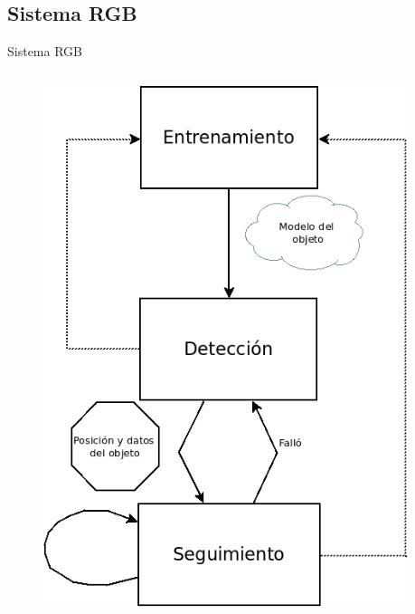\documentclass[]{beamer}
\begin{document}
\subsection{Sistema RGB}
\begin{frame}[fragile]{Sistema RGB}
    \begin{columns}
        \begin{column}{0.4\textwidth}
            \begin{figure}
                \centering
                \vspace{-25pt}
                \includegraphics[scale=0.3]{img/esquema_seguimiento.png}
            \end{figure}
        \end{column}

        \begin{column}{0.6\textwidth}
\end{column}
\end{columns}
\end{frame}
\end{document}
